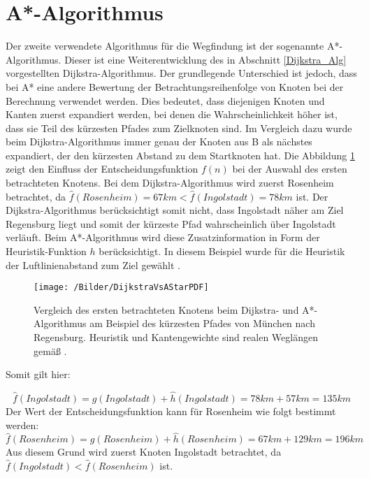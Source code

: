 \section{A*-Algorithmus}
	Der zweite verwendete Algorithmus für die Wegfindung ist der sogenannte A*-Algorithmus. Dieser ist eine Weiterentwicklung des in Abschnitt \ref{Dijkstra_Alg} vorgestellten Dijkstra-Algorithmus. Der grundlegende Unterschied ist jedoch, dass bei A* eine andere Bewertung der Betrachtungsreihenfolge von Knoten bei der Berechnung verwendet werden. Dies bedeutet, dass diejenigen Knoten und Kanten zuerst expandiert werden, bei denen die Wahrscheinlichkeit höher ist, dass sie Teil des kürzesten Pfades zum Zielknoten sind. Im Vergleich dazu wurde beim Dijkstra-Algorithmus immer genau der Knoten aus B als nächstes expandiert, der den kürzesten Abstand zu dem Startknoten hat. Die Abbildung \ref{DijkstraVsA*} zeigt den Einfluss der Entscheidungsfunktion $f(n)$ bei der Auswahl des ersten betrachteten Knotens. Bei dem Dijkstra-Algorithmus wird zuerst Rosenheim betrachtet, da $\hat{f}(Rosenheim)=67km<\hat{f}(Ingolstadt)=78km$ ist. Der Dijkstra-Algorithmus berücksichtigt somit nicht, dass Ingolstadt näher am Ziel Regensburg liegt und somit der kürzeste Pfad wahrscheinlich über Ingolstadt verläuft. Beim A*-Algorithmus wird diese Zusatzinformation in Form der Heuristik-Funktion $h$ berücksichtigt. In diesem Beispiel wurde für die Heuristik der Luftlinienabstand zum Ziel gewählt \cite{Luftlinie}.
	
	\begin{figure}[h]
		\centering
		\texttt{[image: /Bilder/DijkstraVsAStarPDF]}
		\vspace{0.2cm}
		\caption{Vergleich des ersten betrachteten Knotens beim Dijkstra- und A*-Algorithmus am Beispiel des kürzesten Pfades von München nach Regensburg. Heuristik und Kantengewichte sind realen Weglängen gemäß \cite{Luftlinie}.} \label{DijkstraVsA*}
	\end{figure}
	Somit gilt hier:
	
	\begin{equation}
		\hat{f}(Ingolstadt)=g(Ingolstadt)+\hat{h}(Ingolstadt)=78km+57km=135km
	\end{equation}
	Der Wert der Entscheidungsfunktion kann für Rosenheim wie folgt bestimmt werden:
	\begin{equation}
		\hat{f}(Rosenheim)=g(Rosenheim)+\hat{h}(Rosenheim)=67km+129km=196km
	\end{equation}
	Aus diesem Grund wird zuerst Knoten Ingolstadt betrachtet, da $\hat{f}(Ingolstadt)<\hat{f}(Rosenheim)$ ist.
	
